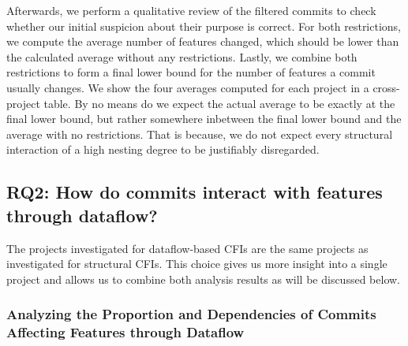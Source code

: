 Afterwards, we perform a qualitative review of the filtered commits to check whether our initial suspicion about their purpose is correct.
For both restrictions, we compute the average number of features changed, which should be lower than the calculated average without any restrictions.
Lastly, we combine both restrictions to form a final lower bound for the number of features a commit usually changes.
We show the four averages computed for each project in a cross-project table. 
By no means do we expect the actual average to be exactly at the final lower bound, but rather somewhere inbetween the final lower bound and the average with no restrictions.
That is because, we do not expect every structural interaction of a high nesting degree to be justifiably disregarded.

\subsection*{\textbf{RQ2: How do commits interact with features through dataflow?}}

The projects investigated for dataflow-based CFIs are the same projects as investigated for structural CFIs.
This choice gives us more insight into a single project and allows us to combine both analysis results as will be discussed below.

\subsubsection*{Analyzing the Proportion and Dependencies of Commits Affecting Features through Dataflow}

